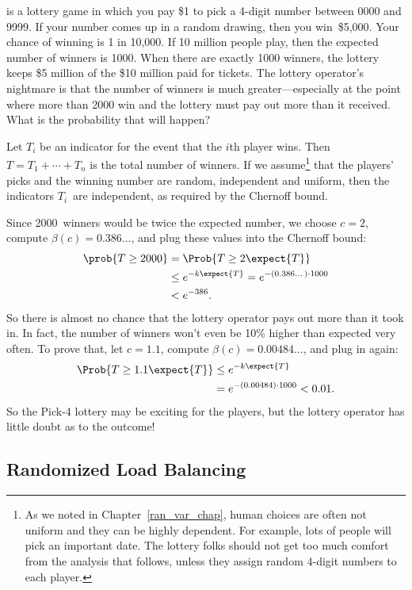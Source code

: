  is a lottery game in which you pay \$1 to pick a 4-digit
number between 0000 and 9999.  If your number comes up in a random
drawing, then you win~\$5,000.  Your chance of winning is 1 in 10,000.
If 10 million people play, then the expected number of winners is
1000.  When there are exactly 1000 winners, the lottery keeps \$5
million of the \$10 million paid for tickets.  The lottery operator's
nightmare is that the number of winners is much greater---especially
at the point where more than 2000 win and the lottery must pay out
more than it received.  What is the probability that will happen?

Let $T_i$ be an indicator for the event that the $i$th player wins.
Then $T = T_1 + \cdots + T_n$ is the total number of winners.  If we
assume\footnote{As we noted in Chapter~\ref{ran_var_chap}, human
  choices are often not uniform and they can be highly dependent.  For
  example, lots of people will pick an important date.  The lottery
  folks should not get too much comfort from the analysis that
  follows, unless they assign random 4-digit numbers to each player.}
that the players' picks and the winning number are random, independent
and uniform, then the indicators $T_i$~are independent, as required by
the Chernoff bound.

Since 2000~winners would be twice the expected number, we choose $c =
2$, compute $\beta(c) = 0.386\dots$, and plug these values
into the Chernoff bound:
\begin{align*}
\prob{T \geq 2000} & = \Prob{T \geq 2 \expect{T}} \\
  & \leq e^{-k \expect{T}} = e^{- (0.386\dots) \cdot 1000} \\
  & < e^{-386}.
\end{align*}
So there is almost no chance that the lottery operator pays out more
than it took in.  In fact, the number of winners won't even be 10\%
higher than expected very often.  To prove that, let $c = 1.1$,
compute $\beta(c) = 0.00484\dots$, and plug in again:
\begin{align*}
\Prob{T \geq 1.1 \expect{T}} & \leq e^{-k \expect{T}} \\
  & = e^{- (0.00484)\cdot 1000} < 0.01.
\end{align*}
So the Pick-4 lottery may be exciting for the players, but the lottery
operator has little doubt as to the outcome!

\subsection{Randomized Load Balancing}\label{sec:load_balancing}

